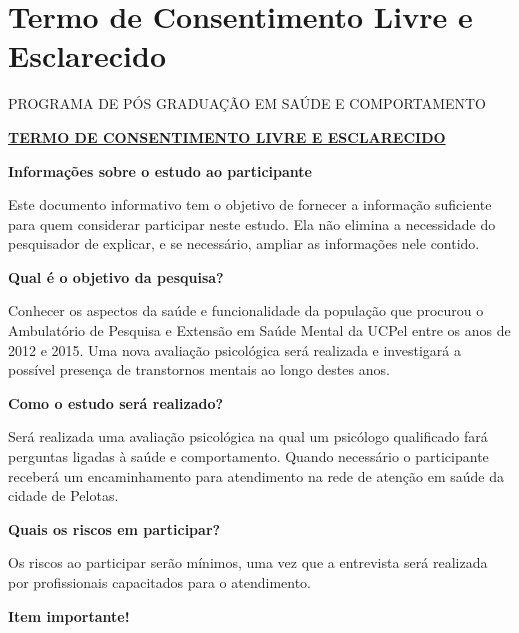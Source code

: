 \documentclass[chapter=TITLE,
               oneside,
               12pt,
               a4paper,
               english,
               brazil]{abntex2}    %
\begin{document}
\begin{anexosenv}
\begin{landscape}
\begin{longtabu}
            \end{longtabu}
    \end{landscape}

    \chapter{Termo de Consentimento Livre e Esclarecido}

        \begin{center}

            \MakeUppercase\imprimirinstituicao

            PROGRAMA DE PÓS GRADUAÇÃO EM SAÚDE E COMPORTAMENTO
            
            \textbf{\underline{TERMO DE CONSENTIMENTO LIVRE E ESCLARECIDO}}

        \end{center}

        {\parindent0pt

        \textbf{Informações sobre o estudo ao participante}

        Este documento informativo tem o objetivo de fornecer a informação
        suficiente para quem considerar participar neste estudo.
        Ela não elimina a necessidade do pesquisador de explicar, e se
        necessário, ampliar as informações nele contido.

        \textbf{Qual é o objetivo da pesquisa?}

        Conhecer os aspectos da saúde e funcionalidade da população que procurou
        o Ambulatório de Pesquisa e Extensão em Saúde Mental da UCPel entre os
        anos de 2012 e 2015. Uma nova avaliação psicológica será realizada e
        investigará a possível presença de transtornos mentais ao longo destes
        anos.

        \textbf{Como o estudo será realizado?}

        Será realizada uma avaliação psicológica na qual um psicólogo qualificado
        fará perguntas ligadas à saúde e comportamento. Quando necessário o
        participante receberá um encaminhamento para atendimento na rede de
        atenção em saúde da cidade de Pelotas.

        \textbf{Quais os riscos em participar?}

        Os riscos ao participar serão mínimos, uma vez que a entrevista será
        realizada por profissionais capacitados para o atendimento.
        
        \textbf{Item importante!}

}
\end{anexosenv}
\end{document}
